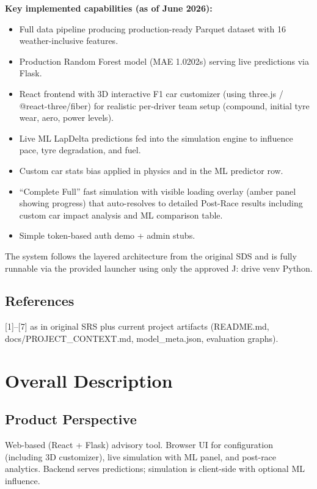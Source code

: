 \documentclass[12pt,a4paper]{article}
\begin{document}
\textbf{Key implemented capabilities (as of June 2026):}
\begin{itemize}
\item Full data pipeline producing production-ready Parquet dataset with 16 weather-inclusive features.
\item Production Random Forest model (MAE 1.0202s) serving live predictions via Flask.
\item React frontend with 3D interactive F1 car customizer (using three.js / @react-three/fiber) for realistic per-driver team setup (compound, initial tyre wear, aero, power levels).
\item Live ML LapDelta predictions fed into the simulation engine to influence pace, tyre degradation, and fuel.
\item Custom car stats bias applied in physics and in the ML predictor row.
\item ``Complete Full'' fast simulation with visible loading overlay (amber panel showing progress) that auto-resolves to detailed Post-Race results including custom car impact analysis and ML comparison table.
\item Simple token-based auth demo + admin stubs.
\end{itemize}

The system follows the layered architecture from the original SDS and is fully runnable via the provided launcher using only the approved J: drive venv Python.

\subsection{References}
[1]--[7] as in original SRS plus current project artifacts (README.md, docs/PROJECT_CONTEXT.md, model\_meta.json, evaluation graphs).

\section{Overall Description}
\subsection{Product Perspective}
Web-based (React + Flask) advisory tool. Browser UI for configuration (including 3D customizer), live simulation with ML panel, and post-race analytics. Backend serves predictions; simulation is client-side with optional ML influence.
\end{document}
